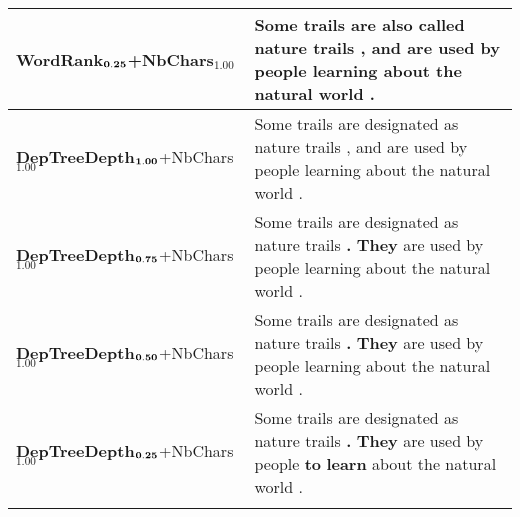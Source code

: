 \documentclass[10pt, a4paper]{article}
\begin{document}
\begin{table*}
{\begin{tabular}{ll}
\textbf{WordRank$_{\bf 0.25}$}\footnotesize{+NbChars$_{1.00}$} & Some trails are \textbf{also} \textbf{called} nature trails , and are used by people learning about the natural world . \\
\midrule
\textbf{DepTreeDepth$_{\bf 1.00}$}\footnotesize{+NbChars$_{1.00}$} & Some trails are designated as nature trails , and are used by people learning about the natural world . \\
\textbf{DepTreeDepth$_{\bf 0.75}$}\footnotesize{+NbChars$_{1.00}$} & Some trails are designated as nature trails \textbf{.} \textbf{They} are used by people learning about the natural world . \\
\textbf{DepTreeDepth$_{\bf 0.50}$}\footnotesize{+NbChars$_{1.00}$} & Some trails are designated as nature trails \textbf{.} \textbf{They} are used by people learning about the natural world . \\
\textbf{DepTreeDepth$_{\bf 0.25}$}\footnotesize{+NbChars$_{1.00}$} & Some trails are designated as nature trails \textbf{.} \textbf{They} are used by people \textbf{to} \textbf{learn} about the natural world . \\
\midrule
& \\ \midrule


\end{tabular}}
\end{table*}
\end{document}
